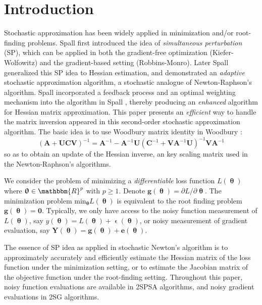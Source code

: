 \documentclass[conference]{IEEEtran}
\begin{document}
\section{Introduction} \label{Introduction}
Stochastic approximation has been widely applied in minimization and/or root-finding problems. Spall \cite{Spall1992} first introduced the idea of \textit{simultaneous perturbation} (SP), which can be applied in both the gradient-free optimization (Kiefer-Wolfowitz) and the gradient-based setting (Robbins-Monro). Later Spall \cite{Spall2000} generalized this SP idea to Hessian estimation, and demonstrated an \textit{adaptive} stochastic approximation algorithm, a stochastic analogue of Newton-Raphson's algorithm. Spall \cite{Spall2009} incorporated a feedback process and an optimal weighting mechanism into the algorithm in Spall \cite{Spall2000}, thereby producing an \textit{enhanced} algorithm for Hessian matrix approximation. This paper presents an \textit{efficient} way to handle the matrix inversion appeared in this second-order stochastic approximation algorithm. The basic idea is to use Woodbury matrix identity in Woodbury \cite{Woodbury1950}:
\begin{equation} \label{eq:MatrixInversion}
(\bm{A}+\bm{UCV})^{-1}=\bm{A}^{-1}-\bm{A}^{-1}\bm{U}(\bm{C}^{-1}+\bm{V}\bm{A}^{-1}\bm{U})^{-1}\bm{V}\bm{A}^{-1}
\end{equation}
so as to obtain an update of the Hessian inverse, an key scaling matrix used in the Newton-Raphson's algorithms.

We consider the problem of minimizing a \textit{differentiable} loss function $ L(\bm{\uptheta}) $ where $ \bm{\uptheta} \in \mathbbm{R}^p $ with $ p\ge1 $. Denote $\bm{g}(\bm{\uptheta})={\partial L}/{\partial \bm{\uptheta}}$. The minimization problem ${\text{min}}_{\bm{\uptheta}}L(\bm{\uptheta})$ is equivalent to the root finding problem $\bm{g}(\bm{\uptheta})=\bm{0}$.  Typically, we only have access to the noisy function measurement of $ L(\bm{\uptheta}) $, say $ y(\bm{\uptheta})=L(\bm{\uptheta})+\upvarepsilon(\bm{\uptheta}) $, or noisy measurement of gradient evaluation, say $\bm{Y}(\bm{\uptheta})=\bm{g}(\bm{\uptheta})+\bm{e}(\bm{\uptheta})$.

The essence of SP idea as applied in stochastic Newton's algorithm is to approximately accurately and efficiently estimate the Hessian matrix of the loss function under the minimization setting, or to estimate the Jacobian matrix of the objective function under the root-finding setting. Throughout this paper, noisy function evaluations are available in 2SPSA algorithms, and noisy gradient evaluations in 2SG algorithms.
\end{document}
